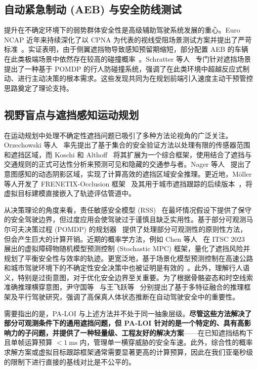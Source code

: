 \documentclass[conference]{IEEEtran}
\begin{document}
\subsection{自动紧急制动 (AEB) 与安全防线测试}
提升在不确定环境下的弱势群体安全性是高级辅助驾驶系统发展的重心。Euro NCAP 近年来持续深化了以 CPNA 为代表的视线受阻场景测试方案并提出了严苛标准~\cite{euroncap2023}。实证表明，由于侧翼遮挡物导致感知预留期缩短，部分配置 AEB 的车辆在此类极端场景中依然存在较高的碰撞概率~\cite{cicchino2022effects}。Schratter 等人~\cite{schratter2019occlusion} 专门针对遮挡场景提出了一种基于 POMDP 的行人防碰撞系统，强调了在此类环境中超越反应式制动、进行主动决策的根本需求。这些发现共同为在规划前端引入速度主动干预管控思路奠定了理论支持。

\subsection{视野盲点与遮挡感知运动规划}
在运动规划中处理不确定性遮挡问题已吸引了多种方法论视角的广泛关注。Orzechowski 等人~\cite{orzechowski2018tackling} 率先提出了基于集合的安全验证方法以处理有限的传感器范围和遮挡区域，而 Koschi 和 Althoff~\cite{koschi2021setbased} 将其扩展为一个综合框架，使用结合了遮挡与交通规则的正式可达性分析来预测可见和隐藏的交通参与者。Nager 等人~\cite{nager2019shadows} 提出了意图感知的动态阴影区域，实现了计算高效的遮挡区域安全推理。更近地，M\"{o}ller 等人开发了 FRENETIX-Occlusion 框架~\cite{blindspot2024} 及其用于城市遮挡跟踪的后续版本~\cite{occtrack2025}，将虚拟目标建模直接嵌入了轨迹评估管道中。

从决策理论的角度来看，责任敏感安全模型 (RSS)~\cite{shalev2017rss} 在最坏情况假设下提供了保守的安全驾驶边界，但过度应用会使驾驶过于谨慎且缺乏实用性。基于部分可观测马尔可夫决策过程 (POMDP) 的规划器~\cite{zhang2021pomdp} 提供了处理部分可观测性的原则性方法，但会产生巨大的计算开销。近期的概率学方法，例如 Chen 等人~\cite{chen2023quantified} 在 ITSC 2023 展出的虚拟障碍物随机模型预测控制 (Stochastic MPC) 框架，量化了遮挡风险并规划了平衡安全性与效率的轨迹。更宽泛地，基于场景化模型预测控制在高速公路和城市驾驶环境下的不确定性安全决策中也被证明是有效的~\cite{cesari2017mpc}。此外，理解行人语义，特别是过街意图，对于优化安全边界至关重要。为了根据骨骼姿态和时空线索准确推理横穿意图，尹守国等~\cite{yin2026pedestrian} 与王飞跃等~\cite{wang2024parallel} 分别提出了基于多特征融合的推理框架及平行驾驶研究，强调了高保真人体状态推断在自动驾驶安全中的重要性。

需要指出的是，PA-LOI 与上述方法并不处于同一抽象层级。\textbf{尽管这些方法解决了部分可观测条件下的通用遮挡问题，但 PA-LOI 针对的是一个特定的、具有高影响力的子问题，并提供了一种轻量级、工程友好的解决方案}——在已知遮挡结构下且单帧运算预算 $< \SI{1}{\milli\second}$ 内，管理单一横穿威胁的安全车速。此外，综合性的概率求解方案或虚拟目标跟踪框架通常需要显著更高的计算预算，因此在我们亚毫秒级的限制下进行直接的基线对比是不公平的。
\end{document}
